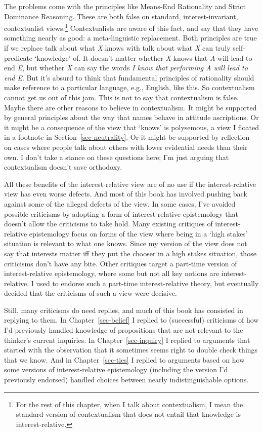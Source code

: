 \documentclass[
  10pt,
  letterpaper,
  twoside]{scrbook}
\begin{document}
The problems come with the principles like Means-End Rationality and
Strict Dominance Reasoning. These are both false on standard,
interest-invariant, contextualist views.\footnote{For the rest of this
  chapter, when I talk about contextualism, I mean the standard version
  of contextualism that does not entail that knowledge is
  interest-relative.} Contextualists are aware of this fact, and say
that they have something nearly as good: a meta-linguistic replacement.
Both principles are true if we replace talk about what \emph{X} knows
with talk about what \emph{X} can truly self-predicate `knowledge' of.
It doesn't matter whether \emph{X} knows that \emph{A} will lead to end
\emph{E}, but whether \emph{X} can say the words \emph{I know that
performing A will lead to end E}. But it's absurd to think that
fundamental principles of rationality should make reference to a
particular language, e.g., English, like this. So contextualism cannot
get us out of this jam. This is not to say that contextualism is false.
Maybe there are other reasons to believe in contextualism. It might be
supported by general principles about the way that names behave in
attitude ascriptions. Or it might be a consequence of the view that
`knows' is polysemous, a view I floated in a footnote in
Section~\ref{sec-neutrality}. Or it might be supported by reflection on
cases where people talk about others with lower evidential needs than
their own. I don't take a stance on these questions here; I'm just
arguing that contextualism doesn't save orthodoxy.

All these benefits of the interest-relative view are of no use if the
interest-relative view has even worse defects. And most of this book has
involved pushing back against some of the alleged defects of the view.
In some cases, I've avoided possible criticisms by adopting a form of
interest-relative epistemology that doesn't allow the criticisms to take
hold. Many existing critiques of interest-relative epistemology focus on
forms of the view where being in a `high stakes' situation is relevant
to what one knows. Since my version of the view does not say that
interests matter iff they put the chooser in a high stakes situation,
those criticisms don't have any bite. Other critiques target a part-time
version of interest-relative epistemology, where some but not all key
notions are interest-relative. I used to endorse such a part-time
interest-relative theory, but eventually decided that the criticisms of
such a view were decisive.

Still, many criticisms do need replies, and much of this book has
consisted in replying to them. In Chapter~\ref{sec-belief} I replied to
(successful) criticisms of how I'd previously handled knowledge of
propositions that are not relevant to the thinker's current inquiries.
In Chapter~\ref{sec-inquiry} I replied to arguments that started with
the observation that it sometimes seems right to double check things
that we know. And in Chapter~\ref{sec-ties} I replied to arguments based
on how some versions of interest-relative epistemology (including the
version I'd previously endorsed) handled choices between nearly
indistinguishable options.
\end{document}
